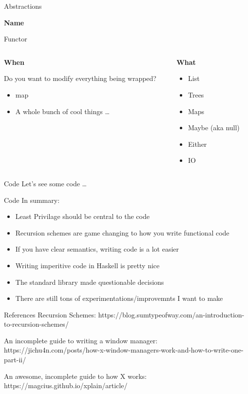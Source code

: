 \documentclass[10pt]{beamer}
\newcommand\myheading[1]{%
  \par\bigskip
  {\Large\bfseries#1}\par\smallskip}
\begin{document}
\begin{frame}[fragile]{Abstractions}
  \myheading{Name}
  Functor

  \begin{columns}[T]
    \begin{column}{.48\textwidth}
      \myheading{When}
      Do you want to modify everything being wrapped?

      \begin{itemize}
        \item map
        \item A whole bunch of cool things \ldots
      \end{itemize}
  \end{column}

    \begin{column}{.48\textwidth}
  \myheading{What}
  \begin{itemize}
    \item List
    \item Trees
    \item Maps
    \item Maybe (aka null)
    \item Either
    \item IO
  \end{itemize}
  \end{column}
  \end{columns}
\end{frame}

\begin{frame}[fragile]{Code}
  Let's see some code \ldots
\end{frame}

\begin{frame}[fragile]{Code}
  In summary:
  \begin{itemize}
    \item Least Privilage should be central to the code
    \item Recursion schemes are game changing to how you write functional code
    \item If you have clear semantics, writing code is a lot easier
    \item Writing imperitive code in Haskell is pretty nice
    \item The standard library made questionable decisions
    \item There are still tons of experimentations/improvemnts I want to make
  \end{itemize}
\end{frame}

\begin{frame}[fragile]{References}
  Recursion Schemes: https://blog.sumtypeofway.com/an-introduction-to-recursion-schemes/

  An incomplete guide to writing a window manager: https://jichu4n.com/posts/how-x-window-managers-work-and-how-to-write-one-part-ii/

  An awesome, incomplete guide to how X works: https://magcius.github.io/xplain/article/
\end{frame}
\end{document}
